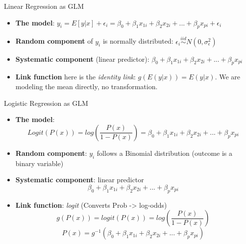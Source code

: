 \documentclass[ignorenonframetext,]{beamer}
\begin{document}
\begin{frame}{Linear Regression as GLM}
\protect\hypertarget{linear-regression-as-glm}{}

\begin{itemize}
\item
  \textbf{The model}:
  \(y_i = E[y|x] + \epsilon_i = \beta_0 + \beta_1 x_{1i} + \beta_2 x_{2i} + ... + \beta_p x_{pi} + \epsilon_i\)
\item
  \textbf{Random component} of \(y_i\) is normally distributed:
  \(\epsilon_i \stackrel{iid}{\sim} N(0, \sigma_\epsilon^2)\)
\item
  \textbf{Systematic component} (linear predictor):
  \(\beta_0 + \beta_1 x_{1i} + \beta_2 x_{2i} + ... + \beta_p x_{pi}\)
\item
  \textbf{Link function} here is the \emph{identity link}:
  \(g(E(y | x)) = E(y | x)\). We are modeling the mean directly, no
  transformation.
\end{itemize}

\end{frame}

\begin{frame}{Logistic Regression as GLM}
\protect\hypertarget{logistic-regression-as-glm}{}

\begin{itemize}
\item
  \textbf{The model}: \[
  Logit(P(x)) = log \left( \frac{P(x)}{1-P(x)} \right) = \beta_0 + \beta_1 x_{1i} + \beta_2 x_{2i} + ... + \beta_p x_{pi}
  \]
\item
  \textbf{Random component}: \(y_i\) follows a Binomial distribution
  (outcome is a binary variable)
\item
  \textbf{Systematic component}: linear predictor \[
  \beta_0 + \beta_1 x_{1i} + \beta_2 x_{2i} + ... + \beta_p x_{pi}
  \]
\item
  \textbf{Link function}: \emph{logit} (Converts Prob -\textgreater{}
  log-odds) \[
  g(P(x)) = logit(P(x)) = log\left( \frac{P(x)}{1-P(x)} \right)
  \] \[
  P(x) = g^{-1}\left( \beta_0 + \beta_1 x_{1i} + \beta_2 x_{2i} + ... + \beta_p x_{pi}
   \right)
  \]
\end{itemize}

\end{frame}
\end{document}
